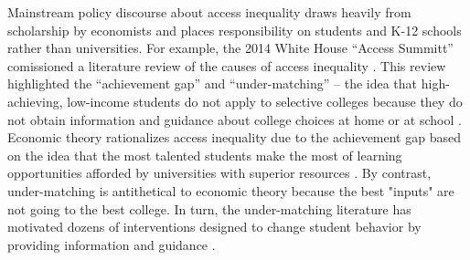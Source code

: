 \documentclass[twoside]{article}
\begin{document}
Mainstream policy discourse about access inequality draws heavily from scholarship by economists and places responsibility on students and K-12 schools rather than universities. For example, the 2014 White House ``Access Summitt'' comissioned a literature review of the causes of access inequality \citep{RN4016}.  This review highlighted the ``achievement gap'' and ``under-matching'' -- the idea that high-achieving, low-income students do not apply to selective colleges because they do not obtain information and guidance about college choices at home or at school \citep{RN3699,RN3700}.  Economic theory rationalizes access inequality due to the achievement gap based on the idea that the most talented students make the most of learning opportunities afforded by universities with superior resources \citep{RN1549,RN2247,RN2402,RN1545}. By contrast, under-matching is antithetical to economic theory because the best "inputs" are not going to the best college. In turn, the under-matching literature has motivated dozens of interventions designed to change student behavior by providing information and guidance \citep[e.g., ][]{RN4352,RN4345,RN4351}.  
\end{document}
